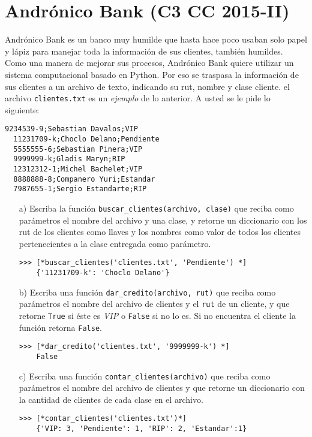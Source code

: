 \section{Andrónico Bank (C3 CC 2015-II)}

  Andrónico Bank es un banco muy humilde
  que hasta hace poco usaban solo papel y lápiz
  para manejar toda la información de sus clientes,
  también humildes.
  Como una manera de mejorar sus procesos,
  Andrónico Bank quiere utilizar un sistema computacional
  basado en Python.
  Por eso se traspasa la información de sus clientes
  a un archivo de texto,
  indicando su rut,
  nombre y clase cliente.
  el archivo \texttt{clientes.txt}
  es un \emph{ejemplo} de lo anterior.
  A usted se le pide lo siguiente:
  
  \begin{lstlisting}[style = consola, caption = \texttt{clientes.txt}]
  9234539-9;Sebastian Davalos;VIP
  11231709-k;Choclo Delano;Pendiente
  5555555-6;Sebastian Pinera;VIP
  9999999-k;Gladis Maryn;RIP
  12312312-1;Michel Bachelet;VIP
  8888888-8;Companero Yuri;Estandar
  7987655-1;Sergio Estandarte;RIP
  \end{lstlisting}
  
  \begin{itemize}
  \item[a)]
    Escriba la función
    \texttt{buscar\_clientes(archivo, clase)}
    que reciba como parámetros el nombre del archivo
    y una clase,
    y retorne un diccionario con los rut
    de los clientes como llaves
    y los nombres como valor de todos los clientes
    pertenecientes a la clase entregada como parámetro.
    
    \begin{lstlisting}[style = consola]
    >>> [*buscar_clientes('clientes.txt', 'Pendiente') *]
    {'11231709-k': 'Choclo Delano'}
    \end{lstlisting}
  \item[b)]
    Escriba una función
    \texttt{dar\_credito(archivo, rut)}
    que reciba como parámetros
    el nombre del archivo de clientes
    y el \texttt{rut} de un cliente,
    y que retorne \texttt{True}
    si éste es \emph{VIP} o 
    \texttt{False} si no lo es.
    Si no encuentra el cliente
    la función retorna \texttt{False}.
    
    \begin{lstlisting}[style = consola]
    >>> [*dar_credito('clientes.txt', '9999999-k') *]
    False
    \end{lstlisting}
  \item[c)]
    Escriba una función
    \texttt{contar\_clientes(archivo)}
    que reciba como parámetros el nombre del archivo
    de clientes y que retorne un diccionario
    con la cantidad de clientes de cada clase
    en el archivo.
    
    \begin{lstlisting}[style = consola]
    >>> [*contar_clientes('clientes.txt')*]
    {'VIP: 3, 'Pendiente': 1, 'RIP': 2, 'Estandar':1}
    \end{lstlisting}
  \end{itemize}